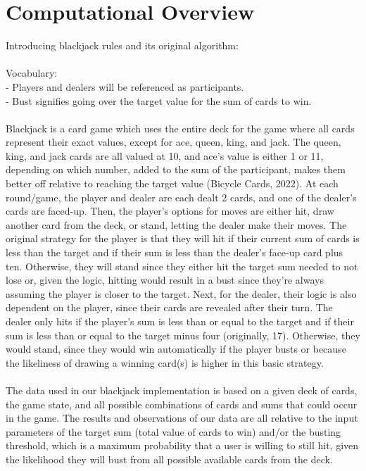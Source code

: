 \documentclass[fontsize=11pt]{article}
\begin{document}
\section*{Computational Overview}
Introducing blackjack rules and its original algorithm:
\\\\
Vocabulary:
\\
- Players and dealers will be referenced as participants.
\\
- Bust signifies going over the target value for the sum of cards to win.
\\\\
Blackjack is a card game which uses the entire deck for the game where all cards represent their exact values, except for ace, queen, king, and jack. The queen, king, and jack cards are all valued at 10, and ace’s value is either 1 or 11, depending on which number, added to the sum of the participant, makes them better off relative to reaching the target value (Bicycle Cards, 2022). At each round/game, the player and dealer are each dealt 2 cards, and one of the dealer’s cards are faced-up. Then, the player’s options for moves are either hit, draw another card from the deck, or stand, letting the dealer make their moves. The original strategy for the player is that they will hit if their current sum of cards is less than the target and if their sum is less than the dealer’s face-up card plus ten. Otherwise, they will stand since they either hit the target sum needed to not lose or, given the logic, hitting would result in a bust since they’re always assuming the player is closer to the target. Next, for the dealer, their logic is also dependent on the player, since their cards are revealed after their turn. The dealer only hits if the player’s sum is less than or equal to the target and if their sum is less than or equal to the target minus four (originally, 17). Otherwise, they would stand, since they would win automatically if the player busts or because the likeliness of drawing a winning card(s) is higher in this basic strategy.
\\\\
The data used in our blackjack implementation is based on a given deck of cards, the game state, and all possible combinations of cards and sums that could occur in the game. The results and observations of our data are all relative to the input parameters of the target sum (total value of cards to win) and/or the busting threshold, which is a maximum probability that a user is willing to still hit, given the likelihood they will bust from all possible available cards from the deck.
\end{document}
